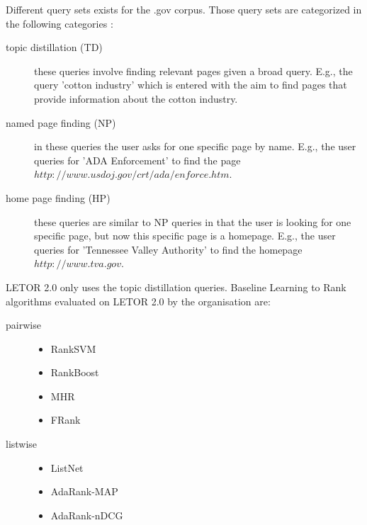 Different query sets exists for the .gov corpus. Those query sets are categorized in the following categories \cite{Craswell2003}:
\begin{description}
\item[topic distillation (TD)]these queries involve finding relevant pages given a broad query. E.g., the query 'cotton industry' which is entered with the aim to find pages that provide information about the cotton industry.
\item[named page finding (NP)]in these queries the user asks for one specific page by name. E.g., the user queries for 'ADA Enforcement' to find the page $http://www.usdoj.gov/crt/ada/enforce.htm$.
\item[home page finding (HP)]these queries are similar to NP queries in that the user is looking for one specific page, but now this specific page is a homepage. E.g., the user queries for 'Tennessee Valley Authority' to find the homepage $http://www.tva.gov$.
\end{description}

LETOR 2.0 only uses the topic distillation queries. Baseline Learning to Rank algorithms evaluated on LETOR 2.0 by the organisation are:
\begin{description}
\item[pairwise]{\leavevmode
	\begin{itemize}
	\item Rank\ac{SVM} \cite{Herbrich1999,Joachims2002}
	\item RankBoost \cite{Freund2003}
	\item \ac{MHR} \cite{Qin2007}
	\item FRank \cite{Tsai2007}
	\end{itemize}}
\item[listwise]{\leavevmode
	\begin{itemize}
	\item ListNet \cite{Cao2007}
	\item AdaRank-MAP \cite{Xu2007}
	\item AdaRank-nDCG \cite{Xu2007}
	\end{itemize}}
\end{description} 

